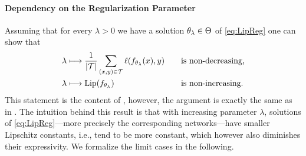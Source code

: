 \paragraph{Dependency on the Regularization Parameter} Assuming that for every $\lambda>0$ we have a solution $\theta_\lambda\in\Theta$ of \cref{eq:LipReg} one can show that
%
\begin{alignat*}{2}
\lambda&\longmapsto
\frac{1}{\left|\mathcal{T}\right|}
\sum_{(x,y)\in\mathcal{T}}\ell(f_{\theta_\lambda}(x),y) \quad&&\text{is non-decreasing,}
\\
\lambda&\longmapsto\operatorname{Lip}(f_{\theta_{\lambda}}) 
\quad&&\text{is non-increasing.}
\end{alignat*}
%
%
This statement is the content of \cite[Prop. 2]{bungert2021clip}, however, the argument is exactly the same as in \cite{burger2013guide}. The intuition behind this result is that with increasing parameter $\lambda$, solutions of \cref{eq:LipReg}---more precisely the corresponding networks---have smaller Lipschitz constants, i.e., tend to be more constant, which however also diminishes their expressivity. We formalize the limit cases in the following.

